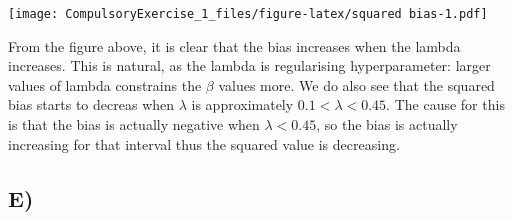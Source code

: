 \documentclass[
]{article}
\begin{document}
\texttt{[image: CompulsoryExercise\_1\_files/figure-latex/squared bias-1.pdf]}

From the figure above, it is clear that the bias increases when the
lambda increases. This is natural, as the lambda is regularising
hyperparameter: larger values of lambda constrains the \(\beta\) values
more. We do also see that the squared bias starts to decreas when
\(\lambda\) is approximately \(0.1 < \lambda < 0.45\). The cause for
this is that the bias is actually negative when \(\lambda < 0.45\), so
the bias is actually increasing for that interval thus the squared value
is decreasing.

\hypertarget{e}{%
\subsection{E)}\label{e}}
\end{document}
